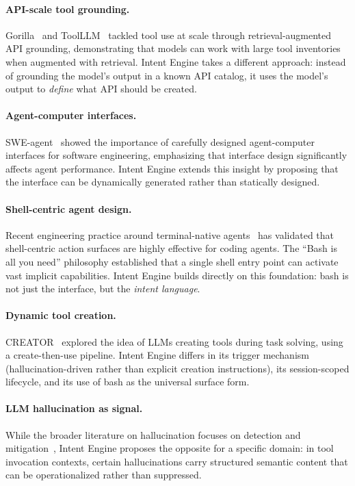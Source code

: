 \documentclass[11pt]{article}
\begin{document}
\paragraph{API-scale tool grounding.}
Gorilla~\citep{gorilla2023} and ToolLLM~\citep{qin2024toolllm} tackled tool use at scale through retrieval-augmented API grounding, demonstrating that models can work with large tool inventories when augmented with retrieval. Intent Engine takes a different approach: instead of grounding the model's output in a known API catalog, it uses the model's output to \emph{define} what API should be created.

\paragraph{Agent-computer interfaces.}
SWE-agent~\citep{sweagent2024} showed the importance of carefully designed agent-computer interfaces for software engineering, emphasizing that interface design significantly affects agent performance. Intent Engine extends this insight by proposing that the interface can be dynamically generated rather than statically designed.

\paragraph{Shell-centric agent design.}
Recent engineering practice around terminal-native agents~\citep{shihipar2026bash} has validated that shell-centric action surfaces are highly effective for coding agents. The ``Bash is all you need'' philosophy established that a single shell entry point can activate vast implicit capabilities. Intent Engine builds directly on this foundation: bash is not just the interface, but the \emph{intent language}.

\paragraph{Dynamic tool creation.}
CREATOR~\citep{qian2023creator} explored the idea of LLMs creating tools during task solving, using a create-then-use pipeline. Intent Engine differs in its trigger mechanism (hallucination-driven rather than explicit creation instructions), its session-scoped lifecycle, and its use of bash as the universal surface form.

\paragraph{LLM hallucination as signal.}
While the broader literature on hallucination focuses on detection and mitigation~\citep{huang2023hallucination}, Intent Engine proposes the opposite for a specific domain: in tool invocation contexts, certain hallucinations carry structured semantic content that can be operationalized rather than suppressed.
\end{document}
